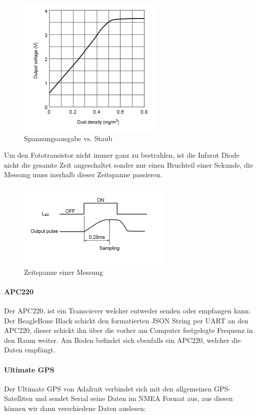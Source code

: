 \begin{figure}[h]
	\centering
	\includegraphics[scale=0.5]{2_Beschreibung_des_CANSAT/graph_photodiode_sharp.png}
	\caption{Spannungsausgabe vs. Staub}
	\label{graph photodiode}
\end{figure}

Um den Fototransistor nicht immer ganz zu bestrahlen, ist die Infarot Diode nicht die gesamte Zeit angeschaltet sonder nur einen Bruchteil einer Sekunde, die Messung muss inerhalb dieser Zeitspanne passieren.

\begin{figure}[h]
	\centering
	\includegraphics[scale=0.5]{2_Beschreibung_des_CANSAT/graph_output_sampling.png}
	\caption{Zeitspanne einer Messung}
	\label{sampling}
\end{figure}

\paragraph{APC220}
Der APC220, ist ein Transciever welcher entweder senden oder empfangen kann. Der BeagleBone Black schickt den formatierten JSON String per UART an den APC220, dieser schickt ihn über die vorher am Computer festgelegte Frequenz in den Raum weiter. Am Boden befindet sich ebenfalls ein APC220, welcher die Daten empfängt.

\paragraph{Ultimate GPS}
Der Ultimate GPS von Adafruit verbindet sich mit den allgemeinen GPS-Satelliten und sendet Serial seine Daten im NMEA Format aus, aus diesen können wir dann verschiedene Daten auslesen:

